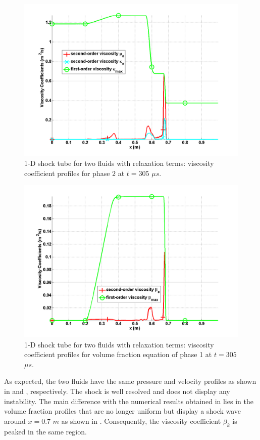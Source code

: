 \begin{figure}[H]
\centering
\includegraphics[width=\textwidth]{figures/SEM/relaxation_two_phases_vapor_viscosity_kappa_mu.png}
\caption{1-D shock tube for two fluids with relaxation terms: viscosity coefficient profiles for phase $2$ at $t=305$ $\mu s$.}
\label{fig:two-fluids-rel-visc-1-7-eqn-sect4}
\end{figure}
%
\begin{figure}[H]
\centering
\includegraphics[width=\textwidth]{figures/SEM/relaxation_two_phases_liquid_beta.png}
\caption{1-D shock tube for two fluids with relaxation terms: viscosity coefficient profiles for volume fraction equation of phase 1 at $t=305$ $\mu s$.}
\label{fig:two-fluids-rel-vf-visc-1-7-eqn-sect4}
\end{figure}
%
As expected, the two fluids have the same pressure and velocity profiles as shown in  and , respectively. The shock is well resolved and does not display any instability. The main difference with the numerical results obtained in  lies in the volume fraction profiles that are no longer uniform but display a shock wave around $x=0.7$ $m$ as shown in . Consequently, the viscosity coefficient $\beta_k$ is peaked in the same region.  
